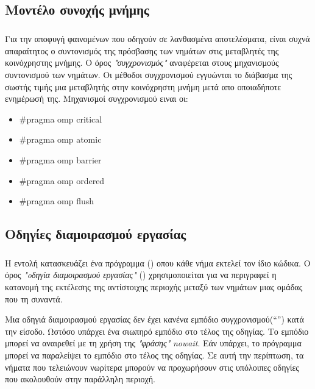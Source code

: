\subsection{Μοντέλο συνοχής μνήμης}
\subparagraph{}
Για την αποφυγή φαινομένων  που οδηγούν σε λανθασμένα αποτελέσματα, είναι συχνά απαραίτητος ο συντονισμός της πρόσβασης των νημάτων στις μεταβλητές της κοινόχρηστης μνήμης. Ο όρος \emph{"συγχρονισμός"} αναφέρεται στους μηχανισμούς συντονισμού των νημάτων. Οι μέθοδοι συγχρονισμού εγγυώνται το διάβασμα της σωστής τιμής μια μεταβλητής στην κοινόχρηστη μνήμη μετά απο οποιαδήποτε ενημέρωσή της. Μηχανισμοί συγχρονισμού ειναι οι\cite{book2_23}:
\begin{itemize}
    \item {\#}pragma omp critical 
    \item {\#}pragma omp atomic
    \item {\#}pragma omp barrier 
    \item {\#}pragma omp ordered
    \item {\#}pragma omp flush
\end{itemize}

\subsection{Οδηγίες διαμοιρασμού εργασίας}
\subparagraph{}
Η εντολή  κατασκευάζει ένα  πρόγραμμα () οπου κάθε νήμα εκτελεί τον ίδιο κώδικα. Ο όρος \emph{"oδηγία διαμοιρασμού εργασίας"} () χρησιμοποιείται για να περιγραφεί η κατανομή της εκτέλεσης της αντίστοιχης περιοχής μεταξύ των νημάτων μιας ομάδας που τη συναντά.

Μια οδηγιά διαμοιρασμού εργασίας δεν έχει κανένα εμπόδιο συγχρονισμού(“”) κατά την είσοδο. Ωστόσο υπάρχει ένα σιωπηρό εμπόδιο στο τέλος της οδηγίας. Το εμπόδιο μπορεί να αναιρεθεί με τη χρήση της \emph{"φράσης"}  \emph{nowait}. Εάν υπάρχει, το πρόγραμμα μπορεί να παραλείψει το εμπόδιο στο τέλος της οδηγίας. Σε αυτή την περίπτωση, τα νήματα που τελειώνουν νωρίτερα μπορούν να προχωρήσουν στις υπόλοιπες οδηγίες που ακολουθούν στην παράλληλη περιοχή\cite{openmpse16}.

\ \\
\ \\
